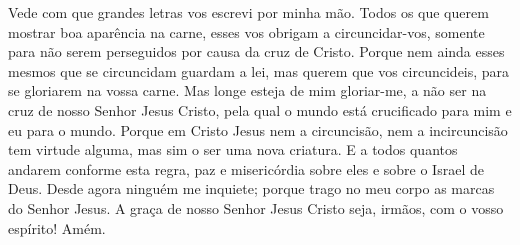 Vede com que grandes letras vos escrevi por minha mão.
Todos os que querem mostrar boa aparência na carne, esses vos
obrigam a circuncidar-vos, somente para não serem perseguidos por
causa da cruz de Cristo. Porque nem ainda esses mesmos que se
circuncidam guardam a lei, mas querem que vos circuncideis, para se
gloriarem na vossa carne. Mas longe esteja de mim gloriar-me,
a não ser na cruz de nosso Senhor Jesus Cristo, pela qual o mundo
está crucificado para mim e eu para o mundo. Porque em Cristo
Jesus nem a circuncisão, nem a incircuncisão tem virtude alguma, mas
sim o ser uma nova criatura. E a todos quantos andarem
conforme esta regra, paz e misericórdia sobre eles e sobre o Israel
de Deus. Desde agora ninguém me inquiete; porque trago no meu
corpo as marcas do Senhor Jesus. A graça de nosso Senhor
Jesus Cristo seja, irmãos, com o vosso espírito! Amém.

